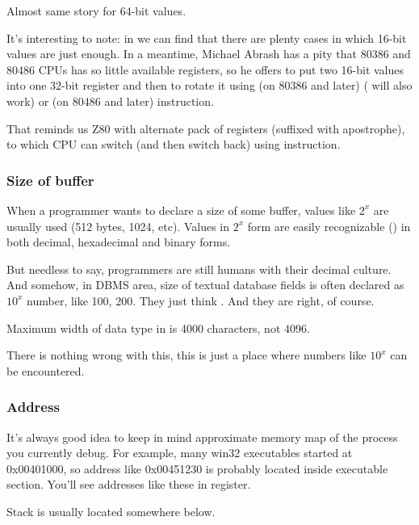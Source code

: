 Almost same story for 64-bit values.


It's interesting to note: in 
we can find that there are plenty cases in which 16-bit values are just enough.
In a meantime, Michael Abrash has a pity that 80386 and 80486 CPUs has so little available registers, so he offers to put
two 16-bit values into one 32-bit register and then to rotate it using
 (on 80386 and later) ( will also work) or 
 (on 80486 and later) instruction.

That reminds us Z80 with alternate pack of registers (suffixed with apostrophe), to which CPU can switch
(and then switch back) using  instruction.

\subsubsection{Size of buffer}

When a programmer wants to declare a size of some buffer, values like $2^x$ are usually used (512 bytes, 1024, etc).
Values in $2^x$ form are easily recognizable () in both decimal, hexadecimal and binary forms.

But needless to say, programmers are still humans with their decimal culture.
And somehow, in \ac{DBMS} area, size of textual database fields is often declared as $10^x$ number, like 100, 200.
They just think .
And they are right, of course.

Maximum width of  data type in \oracle is 4000 characters, not 4096.

There is nothing wrong with this, this is just a place where numbers like $10^x$ can be encountered.

\subsubsection{Address}

It's always good idea to keep in mind approximate memory map of the process you currently debug.
For example, many win32 executables started at 0x00401000, so address like 0x00451230 is probably located inside
executable section. You'll see addresses like these in  register.

Stack is usually located somewhere below. %

